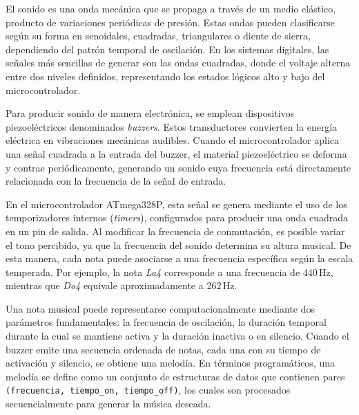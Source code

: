 


El sonido es una onda mecánica que se propaga a través de un medio elástico, producto de variaciones periódicas de presión. Estas ondas pueden clasificarse según su forma en senoidales, cuadradas, triangulares o diente de sierra, dependiendo del patrón temporal de oscilación. En los sistemas digitales, las señales más sencillas de generar son las ondas cuadradas, donde el voltaje alterna entre dos niveles definidos, representando los estados lógicos alto y bajo del microcontrolador.

\vspace{1em}

Para producir sonido de manera electrónica, se emplean dispositivos piezoeléctricos denominados \textit{buzzers}. Estos transductores convierten la energía eléctrica en vibraciones mecánicas audibles. Cuando el microcontrolador aplica una señal cuadrada a la entrada del buzzer, el material piezoeléctrico se deforma y contrae periódicamente, generando un sonido cuya frecuencia está directamente relacionada con la frecuencia de la señal de entrada.

\vspace{1em}

En el microcontrolador ATmega328P, esta señal se genera mediante el uso de los temporizadores internos (\textit{timers}), configurados para producir una onda cuadrada en un pin de salida. Al modificar la frecuencia de conmutación, es posible variar el tono percibido, ya que la frecuencia del sonido determina su altura musical. De esta manera, cada nota puede asociarse a una frecuencia específica según la escala temperada. Por ejemplo, la nota \textit{La4} corresponde a una frecuencia de 440\,Hz, mientras que \textit{Do4} equivale aproximadamente a 262\,Hz.

\vspace{1em}

Una nota musical puede representarse computacionalmente mediante dos parámetros fundamentales: la frecuencia de oscilación, la duración temporal durante la cual se mantiene activa y la duración inactiva o en silencio. Cuando el buzzer emite una secuencia ordenada de notas, cada una con su tiempo de activación y silencio, se obtiene una melodía. En términos programáticos, una melodía se define como un conjunto de estructuras de datos que contienen pares \texttt{(frecuencia, tiempo\_on, tiempo\_off)}, los cuales son procesados secuencialmente para generar la música deseada.

